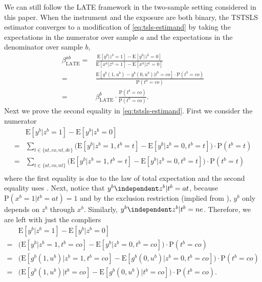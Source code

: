 \documentclass[preprint]{imsart}
\begin{document}
We can still follow the LATE framework in the two-sample setting
considered in this paper. When the instrument and the exposure
are both binary, the TSTSLS estimator converges to a modification of
\eqref{eq:tsls-estimand} by taking the expectations in the numerator
over sample $a$ and the expectations in the denominator over sample
$b$,
\begin{equation}
  \label{eq:tstsls-estimand}
  \begin{split}
    \beta_{\mathrm{LATE}}^{ab}=&\frac{\mathrm{E}[y^b|z^b=1] - \mathrm{E}[y^b|z^b =
      0]}{\mathrm{E}[x^a|z^a=1] - \mathrm{E}[x^a|z^a = 0]} \\
    =&
    \frac{\mathrm{E}[g^b(1,u^b)-g^b(0,u^b)|t^b=co] \cdot \mathrm{P}(t^b =
      co)}{\mathrm{P}(t^a = co)} \\
    =& \beta_{\mathrm{LATE}}^b \cdot \frac{\mathrm{P}(t^b =
      co)}{\mathrm{P}(t^a = co)}.
  \end{split}
\end{equation}
Next we prove
the second equality in \eqref{eq:tstsls-estimand}. First we consider the
numerator
\[
\begin{split}
  &\mathrm{E}[y^b|z^b=1] - \mathrm{E}[y^b|z^b = 0] \\
  =&\sum_{t \in \{at,co,nt,de\}} \big(\mathrm{E}[y^b|z^b=1,t^b=t] -
  \mathrm{E}[y^b|z^b = 0,t^b=t]\big) \cdot \mathrm{P}(t^b=t) \\
  =&\sum_{t \in \{at,co,nt\}} \big(\mathrm{E}[y^b|z^b=1,t^b=t] -
  \mathrm{E}[y^b|z^b = 0,t^b=t]\big) \cdot \mathrm{P}(t^b=t) \\
\end{split}
\]
where the first equality is due to the law of total expectation and
the second equality uses . Next, notice that
$y^b \independent z^b |t^b = at$, because $\mathrm{P}(x^b=1|t^b=at) =
1$ and by the exclusion restriction (implied from
), $y^b$ only depends on $z^b$ through
$x^b$. Similarly, $y^b \independent z^b |t^b = ne$. Therefore, we are
left with just the compliers
\[
\begin{split}
  &\mathrm{E}[y^b|z^b=1] - \mathrm{E}[y^b|z^b = 0] \\
  =&\big(\mathrm{E}[y^b|z^b=1,t^b=co] -
  \mathrm{E}[y^b|z^b = 0,t^b=co]\big) \cdot \mathrm{P}(t^b=co) \\
  =&\big(\mathrm{E}[g^b(1,u^b)|z^b=1,t^b=co] -
  \mathrm{E}[g^b(0,u^b)|z^b = 0,t^b=co]\big) \cdot
  \mathrm{P}(t^b=co) \\
  =&\big(\mathrm{E}[g^b(1,u^b)|t^b=co] -
  \mathrm{E}[g^b(0,u^b)|t^b=co]\big) \cdot \mathrm{P}(t^b=co). \\
\end{split}
\]
\end{document}
